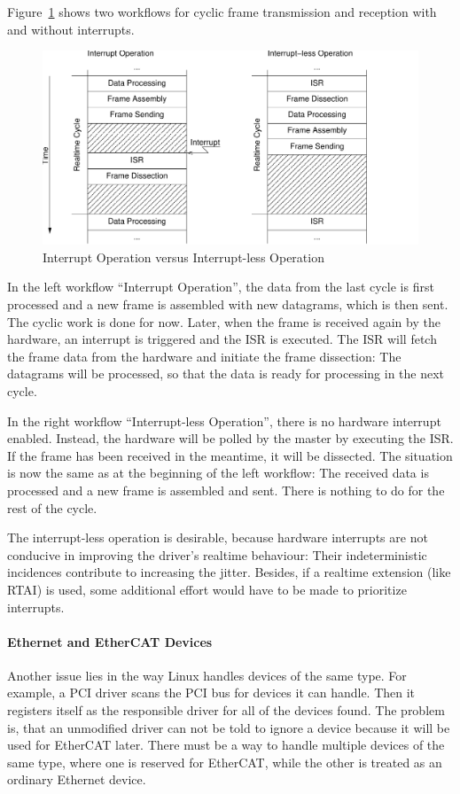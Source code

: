 \documentclass[a4paper,12pt,BCOR6mm,bibtotoc,idxtotoc]{scrbook}
\begin{document}
Figure~\ref{fig:interrupt} shows two workflows for cyclic frame transmission
and reception with and without interrupts.

\begin{figure}[htbp]
  \centering
  \includegraphics[width=.9\textwidth]{images/interrupt}
  \caption{Interrupt Operation versus Interrupt-less Operation}
  \label{fig:interrupt}
\end{figure}

In the left workflow ``Interrupt Operation'', the data from the last cycle is
first processed and a new frame is assembled with new datagrams, which is then
sent.  The cyclic work is done for now.  Later, when the frame is received
again by the hardware, an interrupt is triggered and the ISR is executed. The
ISR will fetch the frame data from the hardware and initiate the frame
dissection: The datagrams will be processed, so that the data is ready for
processing in the next cycle.

In the right workflow ``Interrupt-less Operation'', there is no hardware
interrupt enabled.  Instead, the hardware will be polled by the master by
executing the ISR. If the frame has been received in the meantime, it will be
dissected. The situation is now the same as at the beginning of the left
workflow: The received data is processed and a new frame is assembled and
sent. There is nothing to do for the rest of the cycle.

The interrupt-less operation is desirable, because hardware interrupts are not
conducive in improving the driver's realtime behaviour: Their indeterministic
incidences contribute to increasing the jitter. Besides, if a realtime
extension (like RTAI) is used, some additional effort would have to be made to
prioritize interrupts.

\paragraph{Ethernet and EtherCAT Devices} Another issue lies in the way Linux
handles devices of the same type.  For example, a
PCI driver
scans the PCI bus for devices it can handle. Then it registers itself as the
responsible driver for all of the devices found. The problem is, that an
unmodified driver can not be told to ignore a device because it will be used
for EtherCAT later. There must be a way to handle multiple devices of the same
type, where one is reserved for EtherCAT, while the other is treated as an
ordinary Ethernet device.
\end{document}
